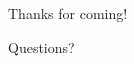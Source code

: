 \section*{}



\begin{frame}[noframenumbering]
 \begin{block}{Thanks for coming!}
 \begin{center}
 \vspace{.4cm}
     {\Huge Questions?}\\[.8cm]
  \end{center}
 \end{block}
\end{frame}
